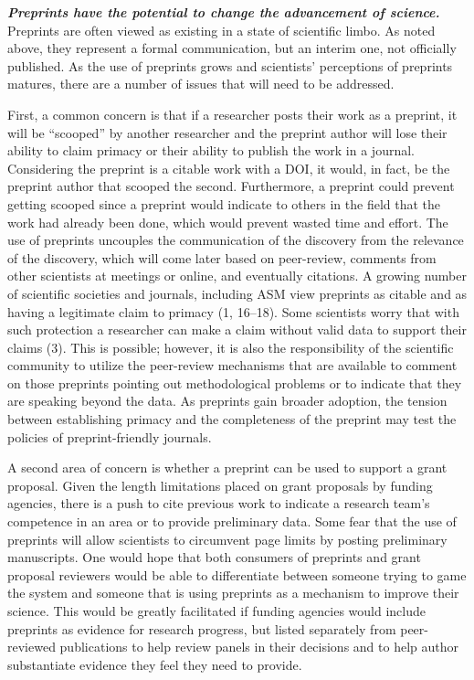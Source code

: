\documentclass[11pt,]{article}
\begin{document}
\textbf{\emph{Preprints have the potential to change the advancement of
science.}} Preprints are often viewed as existing in a state of
scientific limbo. As noted above, they represent a formal communication,
but an interim one, not officially published. As the use of preprints
grows and scientists' perceptions of preprints matures, there are a
number of issues that will need to be addressed.

First, a common concern is that if a researcher posts their work as a
preprint, it will be ``scooped'' by another researcher and the preprint
author will lose their ability to claim primacy or their ability to
publish the work in a journal. Considering the preprint is a citable
work with a DOI, it would, in fact, be the preprint author that scooped
the second. Furthermore, a preprint could prevent getting scooped since
a preprint would indicate to others in the field that the work had
already been done, which would prevent wasted time and effort. The use
of preprints uncouples the communication of the discovery from the
relevance of the discovery, which will come later based on peer-review,
comments from other scientists at meetings or online, and eventually
citations. A growing number of scientific societies and journals,
including ASM view preprints as citable and as having a legitimate claim
to primacy (1, 16--18). Some scientists worry that with such protection
a researcher can make a claim without valid data to support their claims
(3). This is possible; however, it is also the responsibility of the
scientific community to utilize the peer-review mechanisms that are
available to comment on those preprints pointing out methodological
problems or to indicate that they are speaking beyond the data. As
preprints gain broader adoption, the tension between establishing
primacy and the completeness of the preprint may test the policies of
preprint-friendly journals.

A second area of concern is whether a preprint can be used to support a
grant proposal. Given the length limitations placed on grant proposals
by funding agencies, there is a push to cite previous work to indicate a
research team's competence in an area or to provide preliminary data.
Some fear that the use of preprints will allow scientists to circumvent
page limits by posting preliminary manuscripts. One would hope that both
consumers of preprints and grant proposal reviewers would be able to
differentiate between someone trying to game the system and someone that
is using preprints as a mechanism to improve their science. This would
be greatly facilitated if funding agencies would include preprints as
evidence for research progress, but listed separately from peer-reviewed
publications to help review panels in their decisions and to help author
substantiate evidence they feel they need to provide.
\end{document}
